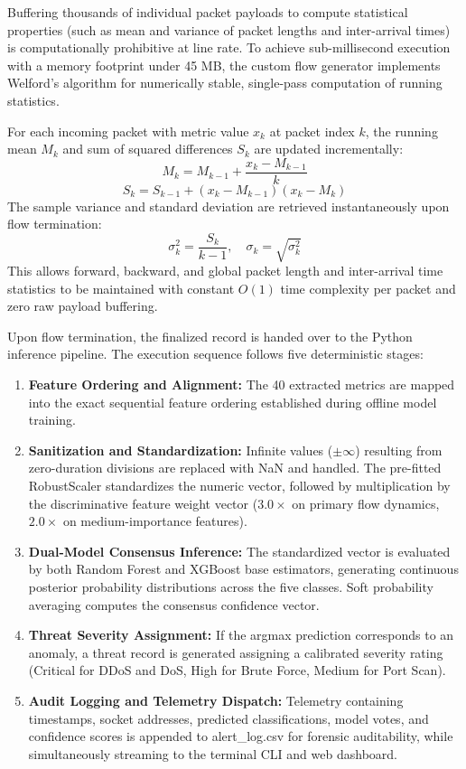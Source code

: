 \documentclass[12pt,a4paper]{report}
\begin{document}
Buffering thousands of individual packet payloads to compute statistical properties (such as mean and variance of packet lengths and inter-arrival times) is computationally prohibitive at line rate. To achieve sub-millisecond execution with a memory footprint under 45 MB, the custom flow generator implements Welford's algorithm for numerically stable, single-pass computation of running statistics.

For each incoming packet with metric value $x_k$ at packet index $k$, the running mean $M_k$ and sum of squared differences $S_k$ are updated incrementally:
\begin{equation}
M_k = M_{k-1} + \frac{x_k - M_{k-1}}{k}
\end{equation}
\begin{equation}
S_k = S_{k-1} + (x_k - M_{k-1})(x_k - M_k)
\end{equation}
The sample variance and standard deviation are retrieved instantaneously upon flow termination:
\begin{equation}
\sigma_k^2 = \frac{S_k}{k - 1}, \quad \sigma_k = \sqrt{\sigma_k^2}
\end{equation}
This allows forward, backward, and global packet length and inter-arrival time statistics to be maintained with constant $O(1)$ time complexity per packet and zero raw payload buffering.

Upon flow termination, the finalized record is handed over to the Python inference pipeline. The execution sequence follows five deterministic stages:
\begin{enumerate}
    \item \textbf{Feature Ordering and Alignment:} The 40 extracted metrics are mapped into the exact sequential feature ordering established during offline model training.
    \item \textbf{Sanitization and Standardization:} Infinite values ($\pm\infty$) resulting from zero-duration divisions are replaced with NaN and handled. The pre-fitted RobustScaler standardizes the numeric vector, followed by multiplication by the discriminative feature weight vector ($3.0\times$ on primary flow dynamics, $2.0\times$ on medium-importance features).
    \item \textbf{Dual-Model Consensus Inference:} The standardized vector is evaluated by both Random Forest and XGBoost base estimators, generating continuous posterior probability distributions across the five classes. Soft probability averaging computes the consensus confidence vector.
    \item \textbf{Threat Severity Assignment:} If the argmax prediction corresponds to an anomaly, a threat record is generated assigning a calibrated severity rating (Critical for DDoS and DoS, High for Brute Force, Medium for Port Scan).
    \item \textbf{Audit Logging and Telemetry Dispatch:} Telemetry containing timestamps, socket addresses, predicted classifications, model votes, and confidence scores is appended to alert\_log.csv for forensic auditability, while simultaneously streaming to the terminal CLI and web dashboard.
\end{enumerate}
\end{document}
